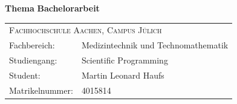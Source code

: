 \begin{titlepage}
	\begin{flushright}
		\textbf{\Large Thema}
		\linebreak
		\linebreak
		\textbf{\Large Bachelorarbeit}
		\linebreak
		\linebreak
	\end{flushright}
	\vfill
	\begin{tabular*}{\linewidth}{ll}
	    \multicolumn{2}{l}{\textsc{Fachhochschule Aachen, Campus Jülich}}\\
		Fachbereich: & Medizintechnik und Technomathematik\\
		Studiengang: & Scientific Programming\\
		Student: & Martin Leonard Haufs\\ 
		Matrikelnummer: & 4015814
	\end{tabular*}
	\vfill	
\end{titlepage}